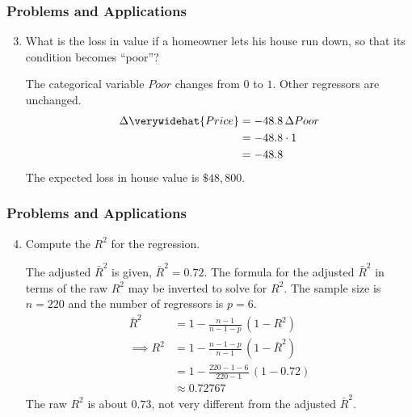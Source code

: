 \begin{frame}
\frametitle{Problems and Applications}

\begin{enumerate}\setcounter{enumi}{2}

\item What is the loss in value if a homeowner lets his house run down, so that its condition becomes ``poor''?

\begin{answer}
The categorical variable $Poor$ changes from $0$ to $1$. Other regressors are unchanged. 
\begin{align*}
\Delta\verywidehat{Price} 
  & = - 48.8\,\Delta Poor\\
  & = - 48.8 \cdot 1\\
  & = - 48.8
\end{align*}
The expected loss in house value is $\$48,800$.
\end{answer}

\end{enumerate}
\end{frame}


\begin{frame}
\frametitle{Problems and Applications}

\begin{enumerate}\setcounter{enumi}{3}

\item Compute the $R^{2}$ for the regression.

\begin{answer}
The adjusted $\bar{R}^{2}$ is given, $\bar{R}^{2}=0.72$. The formula for the adjusted $\bar{R}^{2}$ in terms of the raw $R^{2}$ may be inverted to solve for $R^{2}$. The sample size is $n=220$ and the number of regressors is $p=6$.
\begin{align*}
\bar{R}^2 & = 1 - \frac{n-1}{n-1-p}\,(1-R^{2})\\
\implies 
R^2 & = 1 - \frac{n-1-p}{n-1}\,(1-\bar{R}^{2})\\
    & = 1 - \frac{220-1-6}{220-1}\,(1-0.72)\\
    & \approx 0.72767 
\end{align*}
The raw $R^{2}$ is about $0.73$, not very different from the adjusted $\bar{R}^{2}$. 
\end{answer}

\end{enumerate}
\end{frame}




